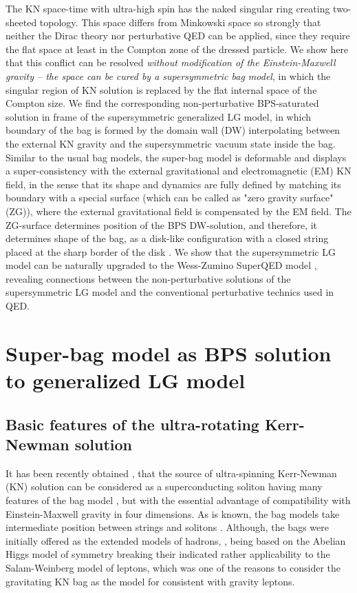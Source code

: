 \documentclass[aps,prd,twocolumn,showpacs]{revtex4}
\begin{document}
The KN space-time  with ultra-high spin has the naked singular ring creating two-sheeted topology. This space differs from Minkowski space so
strongly that neither the Dirac theory nor perturbative QED can be applied, since they require the
flat space at least in the Compton zone of the dressed particle. We show here that  this conflict can be resolved \emph{without modification of the Einstein-Maxwell gravity -- the space can be
cured by a supersymmetric bag model}, in which the singular region of KN solution is replaced by the flat
internal space of the  Compton size. We find the corresponding non-perturbative BPS-saturated
solution in frame of the supersymmetric generalized LG model, in which boundary of the bag is formed
by the domain wall (DW) interpolating between the external KN gravity and the supersymmetric vacuum
state inside the bag. Similar to the usual bag models, the super-bag model is deformable and displays a
super-consistency with the external gravitational and electromagnetic (EM) KN field, in the sense
that its shape and dynamics are fully defined by matching its boundary with a special surface (which can
be called as  "zero gravity surface" (ZG)), where the external gravitational field is compensated by
 the EM field. The ZG-surface determines position of  the  BPS DW-solution, and therefore, it
 determines shape of the bag, as a disk-like configuration with a closed string placed at the sharp border
 of the disk \cite{BurBag,BurBag1,BurPit50El}. We show
that the supersymmetric LG model can be naturally upgraded to the Wess-Zumino SuperQED model \cite{WesBag},
revealing connections between the non-perturbative solutions of the supersymmetric LG model and the
conventional perturbative technics used in QED.


\section{Super-bag model as BPS solution to generalized LG model}

\subsection{Basic features of the ultra-rotating Kerr-Newman solution}
It has been recently obtained \cite{BurSol,BurSol1}, that the source of ultra-spinning
Kerr-Newman (KN) solution can be considered as a superconducting soliton having many features
 of the bag model \cite{BurBag,BurBag1,Bur50}, but
with the essential advantage of compatibility with  Einstein-Maxwell gravity in four dimensions. As
is known, the bag models take intermediate position between strings and solitons
\cite{Giles,JT,Tye}. Although,  the bags  were initially offered  as the extended models of
hadrons, \cite{MIT,SLAC,Dash}, being based on the Abelian  Higgs model of symmetry breaking their
indicated rather applicability to the Salam-Weinberg  model of leptons, which was one of the
reasons to consider the gravitating KN bag as the model for consistent with gravity leptons.
\end{document}
